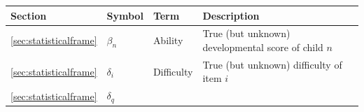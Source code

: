 \documentclass[
]{book}
\begin{document}
\begin{longtable}[]{@{}llll@{}}
\toprule
\begin{minipage}[b]{0.10\columnwidth}\raggedright
Section\strut
\end{minipage} & \begin{minipage}[b]{0.13\columnwidth}\raggedright
Symbol\strut
\end{minipage} & \begin{minipage}[b]{0.13\columnwidth}\raggedright
Term\strut
\end{minipage} & \begin{minipage}[b]{0.53\columnwidth}\raggedright
Description\strut
\end{minipage}\tabularnewline
\midrule
\endhead
\begin{minipage}[t]{0.10\columnwidth}\raggedright
\ref{sec:statisticalframe}\strut
\end{minipage} & \begin{minipage}[t]{0.13\columnwidth}\raggedright
\(\beta_n\)\strut
\end{minipage} & \begin{minipage}[t]{0.13\columnwidth}\raggedright
Ability\strut
\end{minipage} & \begin{minipage}[t]{0.53\columnwidth}\raggedright
True (but unknown) developmental score of child \(n\)\strut
\end{minipage}\tabularnewline
\begin{minipage}[t]{0.10\columnwidth}\raggedright
\ref{sec:statisticalframe}\strut
\end{minipage} & \begin{minipage}[t]{0.13\columnwidth}\raggedright
\(\delta_i\)\strut
\end{minipage} & \begin{minipage}[t]{0.13\columnwidth}\raggedright
Difficulty\strut
\end{minipage} & \begin{minipage}[t]{0.53\columnwidth}\raggedright
True (but unknown) difficulty of item \(i\)\strut
\end{minipage}\tabularnewline
\begin{minipage}[t]{0.10\columnwidth}\raggedright
\ref{sec:statisticalframe}\strut
\end{minipage} & \begin{minipage}[t]{0.13\columnwidth}\raggedright
\(\delta_q\)\strut
\end{minipage} & \begin{minipage}[t]{0.13\columnwidth}\raggedright

\end{minipage}
\end{longtable}
\end{document}

